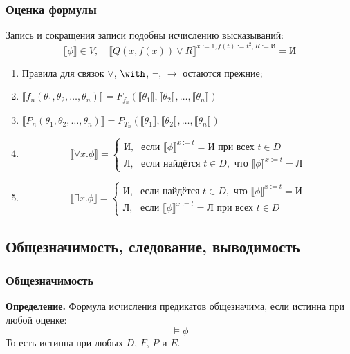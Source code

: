 \documentclass[10pt,a4paper,oneside]{article}
\begin{document}
\subsubsection{Оценка формулы}

Запись и сокращения записи подобны исчислению высказываний: $$\llbracket \phi \rrbracket \in V,\quad
      \llbracket Q(x,f(x))\vee R\rrbracket^{x := 1, f(t) := t^2, R := \text{И}} = \text{И}$$

\begin{enumerate}
\item Правила для связок $\vee$, $\with$, $\neg$, $\rightarrow$ остаются прежние;
\item $\llbracket f_n (\theta_1, \theta_2, \dots, \theta_n) \rrbracket = F_{f_n} (\llbracket\theta_1\rrbracket,
          \llbracket\theta_2\rrbracket, \dots, \llbracket\theta_n\rrbracket)$
\item $\llbracket P_n (\theta_1, \theta_2, \dots, \theta_n) \rrbracket = P_{T_n} (\llbracket\theta_1\rrbracket,
          \llbracket\theta_2\rrbracket, \dots, \llbracket\theta_n\rrbracket)$
\item $$\llbracket \forall x.\phi \rrbracket = \left\{\begin{array}{ll}
   \text{И}, & \text{если } \llbracket\phi\rrbracket^{x := t} = \text{И}\text{ при всех } t \in D\\
   \text{Л}, & \text{если найдётся } t \in D, \text{ что } \llbracket\phi\rrbracket^{x := t} = \text{Л}
  \end{array}\right.$$
\item $$\llbracket \exists x.\phi \rrbracket = \left\{\begin{array}{ll}
   \text{И}, & \text{если найдётся } t \in D, \text{ что } \llbracket\phi\rrbracket^{x := t} = \text{И}\\
   \text{Л}, & \text{если } \llbracket\phi\rrbracket^{x := t} = \text{Л}\text{ при всех } t \in D
  \end{array}\right.$$
\end{enumerate}

\subsection{Общезначимость, следование, выводимость}
\subsubsection{Общезначимость}
{\bf Определение.} Формула исчисления предикатов общезначима, если истинна при любой оценке:
$$\models\phi$$
То есть истинна при любых $D$, $F$, $P$ и $E$.
\end{document}
